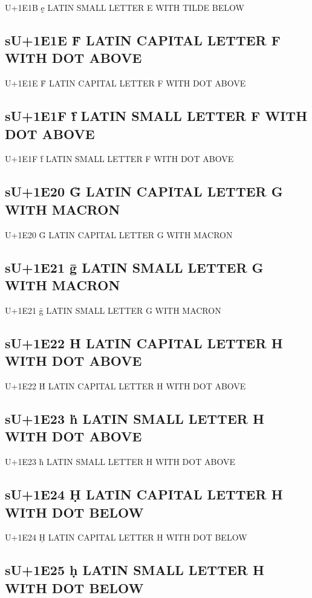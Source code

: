 U+1E1B ḛ LATIN SMALL LETTER E WITH TILDE BELOW

\subsection{sU+1E1E Ḟ LATIN CAPITAL LETTER F WITH DOT ABOVE}

U+1E1E Ḟ LATIN CAPITAL LETTER F WITH DOT ABOVE

\subsection{sU+1E1F ḟ LATIN SMALL LETTER F WITH DOT ABOVE}

U+1E1F ḟ LATIN SMALL LETTER F WITH DOT ABOVE

\subsection{sU+1E20 Ḡ LATIN CAPITAL LETTER G WITH MACRON}

U+1E20 Ḡ LATIN CAPITAL LETTER G WITH MACRON

\subsection{sU+1E21 ḡ LATIN SMALL LETTER G WITH MACRON}

U+1E21 ḡ LATIN SMALL LETTER G WITH MACRON

\subsection{sU+1E22 Ḣ LATIN CAPITAL LETTER H WITH DOT ABOVE}

U+1E22 Ḣ LATIN CAPITAL LETTER H WITH DOT ABOVE

\subsection{sU+1E23 ḣ LATIN SMALL LETTER H WITH DOT ABOVE}

U+1E23 ḣ LATIN SMALL LETTER H WITH DOT ABOVE

\subsection{sU+1E24 Ḥ LATIN CAPITAL LETTER H WITH DOT BELOW}

U+1E24 Ḥ LATIN CAPITAL LETTER H WITH DOT BELOW

\subsection{sU+1E25 ḥ LATIN SMALL LETTER H WITH DOT BELOW}

